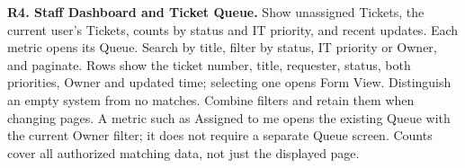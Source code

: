 \begin{contenttable}
{\textbf{R4. Staff Dashboard and Ticket Queue.} Show unassigned Tickets, the current user's Tickets, counts by status and IT priority, and recent updates. Each metric opens its Queue. Search by title, filter by status, IT priority or Owner, and paginate. Rows show the ticket number, title, requester, status, both priorities, Owner and updated time; selecting one opens Form View. Distinguish an empty system from no matches. Combine filters and retain them when changing pages. A metric such as Assigned to me opens the existing Queue with the current Owner filter; it does not require a separate Queue screen. Counts cover all authorized matching data, not just the displayed page.}






\end{contenttable}
